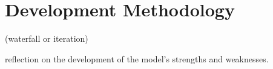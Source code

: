 \chapter{Development Methodology}
(waterfall or iteration)

reflection on the development of the model's strengths and weaknesses.
